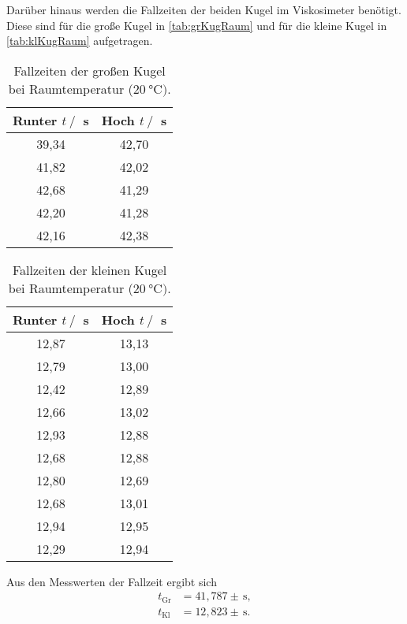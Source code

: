 Darüber hinaus werden die Fallzeiten der beiden Kugel im Viskosimeter benötigt. Diese sind für die große Kugel in \autoref{tab:grKugRaum} und für die kleine Kugel in \autoref{tab:klKugRaum} aufgetragen.

\begin{table}[H]
  \centering
      \caption{Fallzeiten der großen Kugel bei Raumtemperatur ($\SI{20}{\celsius})$.}
      \label{tab:grKugRaum}
      \begin{tabular}{c c}
      \toprule
      Runter $t\:/\:$ s & Hoch $t\:/\:$ s\\
      \midrule
        39,34 & 42,70 \\
        41,82 & 42,02 \\
        42,68 & 41,29 \\
        42,20 & 41,28 \\
        42,16 & 42,38 \\
      \bottomrule
  \end{tabular}
\end{table}

\begin{table}[H]
  \centering
      \caption{Fallzeiten der kleinen Kugel bei Raumtemperatur ($\SI{20}{\celsius})$.}
      \label{tab:klKugRaum}
      \begin{tabular}{c c}
      \toprule
      Runter $t\:/\:$ s & Hoch $t\:/\:$ s\\
      \midrule
        12,87 & 13,13 \\
        12,79 & 13,00 \\
        12,42 & 12,89 \\
        12,66 & 13,02 \\
        12,93 & 12,88 \\
        12,68 & 12,88 \\
        12,80 & 12,69 \\
        12,68 & 13,01 \\
        12,94 & 12,95 \\
        12,29 & 12,94 \\
      \bottomrule
  \end{tabular}
\end{table}

Aus den Messwerten der Fallzeit ergibt sich
\begin{align*}
  t_{\text{Gr}} &= 41,787\pm  \,\si{\second}, \\
  t_{\text{Kl}} &= 12,823\pm  \,\si{\second}. \\
\end{align*}

